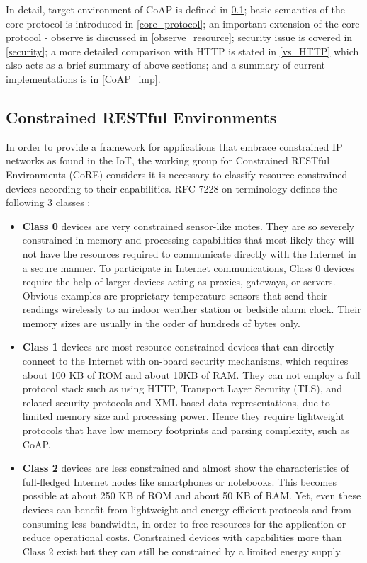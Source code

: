 In detail, target environment of CoAP is defined in \ref{CORE_env}; basic semantics of the core protocol is introduced in \ref{core_protocol}; an important extension of the core protocol - observe is discussed in \ref{observe_resource}; security issue is covered in \ref{security}; a more detailed comparison with HTTP is stated in \ref{vs_HTTP} which also acts as a brief summary of above sections; and a summary of current implementations is in \ref{CoAP_imp}.

\subsection{Constrained RESTful Environments}\label{CORE_env}

In order to provide a framework for applications that embrace constrained IP networks as found in the IoT,  the working group for Constrained RESTful Environments (CoRE) considers it is necessary to classify resource-constrained devices according to their capabilities. RFC 7228 on terminology defines the following 3 classes \cite{constarined_env}\cite{kovatsch2015scalable}:

\begin{itemize}

\item \textbf{Class 0} devices are very constrained sensor-like motes.  They are so severely constrained in memory and processing capabilities that most likely they will not have the resources required to communicate directly with the Internet in a secure manner.  To participate in Internet communications, Class 0 devices require the help of larger devices acting as proxies, gateways, or servers. Obvious examples are proprietary temperature sensors that send their readings wirelessly to an indoor weather station or bedside alarm clock. Their memory sizes are usually in the order of hundreds of bytes only.

\item \textbf{Class 1} devices are most resource-constrained devices that can directly connect to the Internet with on-board security mechanisms, which requires about 100 KB of ROM and about 10KB of RAM.  They can not employ a full protocol stack such as using HTTP, Transport Layer Security (TLS), and related security protocols and XML-based data representations, due to limited memory size and processing power. Hence they require lightweight protocols that have low memory footprints and parsing complexity, such as CoAP.

\item \textbf{Class 2} devices are less constrained and almost show the characteristics of full-fledged Internet nodes like smartphones or notebooks. This becomes possible at about 250 KB of ROM and about 50 KB of RAM. Yet, even these devices can benefit from lightweight and energy-efficient protocols and from consuming less bandwidth, in order to free resources for the application or reduce operational costs. Constrained devices with capabilities more than Class 2 exist but they can still be constrained by a limited energy supply.

\end{itemize}

